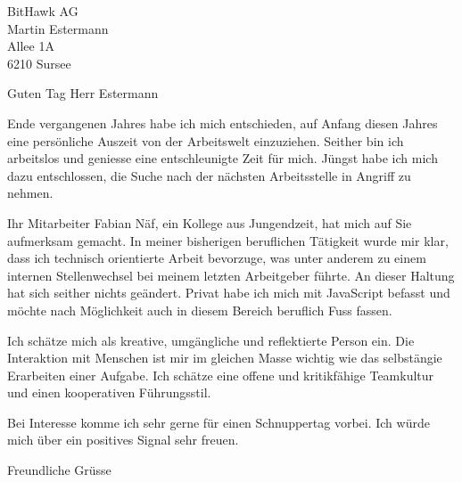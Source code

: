 \documentclass[
	pagenumber=false, 
	parskip=half, 
	fromalign=right, 
	foldmarks=true, 
	addrfield=true 
	]{scrlttr2}
\date{\today}
\begin{document}
\begin{letter}{BitHawk AG \\ Martin Estermann \\ Allee 1A \\ 6210 Sursee} 

\opening{Guten Tag Herr Estermann}

Ende vergangenen Jahres habe ich mich entschieden, auf Anfang diesen Jahres eine persönliche Auszeit von der Arbeitswelt einzuziehen. Seither bin ich arbeitslos und geniesse eine entschleunigte Zeit für mich. Jüngst habe ich mich dazu entschlossen, die Suche nach der nächsten Arbeitsstelle in Angriff zu nehmen.

Ihr Mitarbeiter Fabian Näf, ein Kollege aus Jungendzeit, hat mich auf Sie aufmerksam gemacht. In meiner bisherigen beruflichen Tätigkeit wurde mir klar, dass ich technisch orientierte Arbeit bevorzuge, was unter anderem zu einem internen Stellenwechsel bei meinem letzten Arbeitgeber führte. An dieser Haltung hat sich seither nichts geändert. Privat habe ich mich mit JavaScript befasst und möchte nach Möglichkeit auch in diesem Bereich beruflich Fuss fassen.

Ich schätze mich als kreative, umgängliche und reflektierte Person ein. Die Interaktion mit Menschen ist mir im gleichen Masse wichtig wie das selbstängie Erarbeiten einer Aufgabe. Ich schätze eine offene und kritikfähige Teamkultur und einen kooperativen Führungsstil.

Bei Interesse komme ich sehr gerne für einen Schnuppertag vorbei. Ich würde mich über ein positives Signal sehr freuen. 

\closing{Freundliche Grüsse}


\end{letter}
\end{document}
